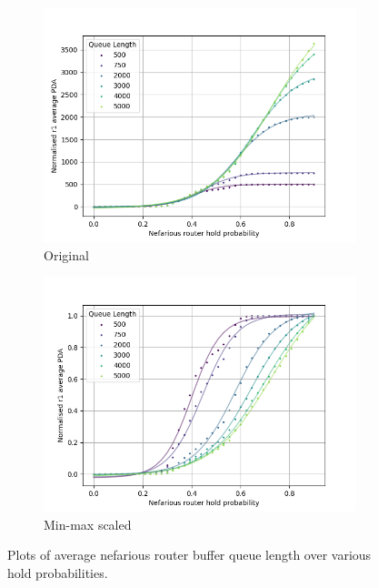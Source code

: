 \begin{figure}[H]
    \centering
    \begin{subfigure}{0.475\textwidth}
        \includegraphics[width=\textwidth]{figs/results/qlen_fitting/qlen_PDA_lm.png}
        \caption{Original}
    \end{subfigure}
    \begin{subfigure}{0.475\textwidth}
        \includegraphics[width=\textwidth]{figs/results/qlen_fitting/norm_qlen_PDA_lm.png}
        \caption{Min-max scaled}
    \end{subfigure}
    \caption{Plots of average nefarious router buffer queue length over various hold probabilities.}
    \label{fig:Rvariedqlenpda}
\end{figure}
